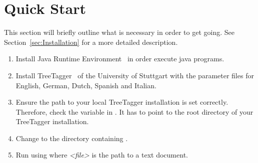 \section{Quick Start}\label{sec:QuickStart}
This section will briefly outline what is necessary in order to get \product{} going. See Section~\ref{sec:Installation} for a more detailed description.
\begin{enumerate}
\item Install Java Runtime Environment~\cite{Java} in order execute java programs.
\item Install TreeTagger~\cite{TreeTagger} of the University of Stuttgart with the parameter files for English, German, Dutch, Spanish and Italian.
\item Ensure the path to your local TreeTagger installation is set correctly. Therefore, check the variable  in \configFile{}. It has to point to the root directory of your TreeTagger installation.
\item Change to the directory containing \executableFile{}.
\item Run \product{} using  where \emph{<file>} is the path to a text document.
\end{enumerate}
